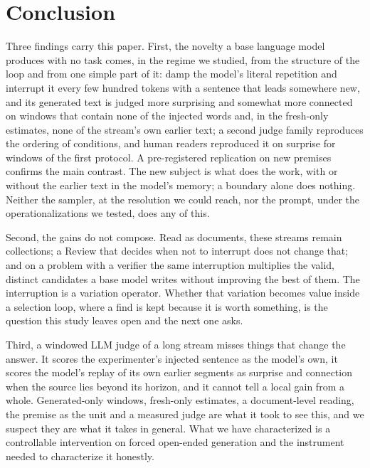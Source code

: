 \section{Conclusion}

Three findings carry this paper. First, the novelty a base language model
produces with no task comes, in the regime we studied, from the structure of
the loop and from one simple part of it: damp the model's literal repetition
and interrupt it every few hundred tokens with a sentence that leads
somewhere new, and its generated text is judged more surprising and
somewhat more connected on windows that contain none of the injected words
and, in the fresh-only estimates, none of the stream's own earlier text; a
second judge family reproduces the ordering of conditions, and human readers
reproduced it on surprise for windows of the first protocol. A
pre-registered replication on new premises
confirms the main contrast. The new subject is what does the work, with or
without the earlier text in the model's memory; a boundary alone does
nothing. Neither the sampler, at the resolution we could reach, nor the
prompt, under the operationalizations we tested, does any of this.

Second, the gains do not compose. Read as documents, these streams remain
collections; a Review that decides when not to interrupt does not change
that; and on a problem with a verifier the same interruption multiplies the
valid, distinct candidates a base model writes without improving the best
of them. The interruption is a variation operator. Whether that variation
becomes value inside a selection loop, where a find is kept because it is
worth something, is the question this study leaves open and the next one
asks.

Third, a windowed LLM judge of a long stream misses things that change the
answer. It scores the experimenter's injected sentence as the model's own,
it scores the model's replay of its own earlier segments as surprise and
connection when the source lies beyond its horizon, and it cannot tell a
local gain from a whole. Generated-only windows, fresh-only estimates, a
document-level reading, the premise as the unit and a measured judge are
what it took to see this, and we suspect they are what it takes in general.
What we have characterized is a controllable intervention on forced
open-ended generation and the instrument needed to characterize it honestly.
